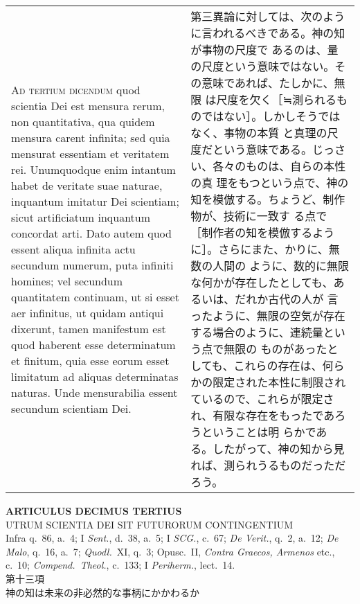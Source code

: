 \documentclass[10pt]{jsarticle} %
\begin{document}
\begin{longtable}{p{21em}p{21em}}
\\


{\scshape Ad tertium dicendum} quod scientia Dei est mensura rerum,
non quantitativa, qua quidem mensura carent infinita; sed quia
mensurat essentiam et veritatem rei. Unumquodque enim intantum habet
de veritate suae naturae, inquantum imitatur Dei scientiam; sicut
artificiatum inquantum concordat arti. Dato autem quod essent aliqua
infinita actu secundum numerum, puta infiniti homines; vel secundum
quantitatem continuam, ut si esset aer infinitus, ut quidam antiqui
dixerunt, tamen manifestum est quod haberent esse determinatum et
finitum, quia esse eorum esset limitatum ad aliquas determinatas
naturas. Unde mensurabilia essent secundum scientiam Dei.


&

第三異論に対しては、次のように言われるべきである。神の知が事物の尺度で
あるのは、量の尺度という意味ではない。その意味であれば、たしかに、無限
は尺度を欠く［≒測られるものではない］。しかしそうではなく、事物の本質
と真理の尺度だという意味である。じっさい、各々のものは、自らの本性の真
理をもつという点で、神の知を模倣する。ちょうど、制作物が、技術に一致す
る点で［制作者の知を模倣するように］。さらにまた、かりに、無数の人間の
ように、数的に無限な何かが存在したとしても、あるいは、だれか古代の人が
言ったように、無限の空気が存在する場合のように、連続量という点で無限の
ものがあったとしても、これらの存在は、何らかの限定された本性に制限され
ているので、これらが限定され、有限な存在をもったであろうということは明
らかである。したがって、神の知から見れば、測られうるものだっただろう。



\end{longtable}
\newpage



\begin{center}
 {\Large {\bf ARTICULUS DECIMUS TERTIUS}}\\
 {\large UTRUM SCIENTIA DEI SIT FUTURORUM CONTINGENTIUM}\\
 {\footnotesize Infra q.~86, a.~4; I {\itshape Sent.}, d.~38, a.~5; I
 {\itshape SCG.}, c.~67; {\itshape De Verit.}, q.~2, a.~12; {\itshape De
 Malo}, q.~16, a.~7; {\itshape Quodl.}~XI, q.~3; Opusc.~II, {\itshape
 Contra Graecos, Armenos} etc., c.~10; {\itshape Compend.~Theol.},
 c.~133; I {\itshape Periherm.}, lect.~14.}\\
 {\Large 第十三項\\神の知は未来の非必然的な事柄にかかわるか}
\end{center}
\end{document}
